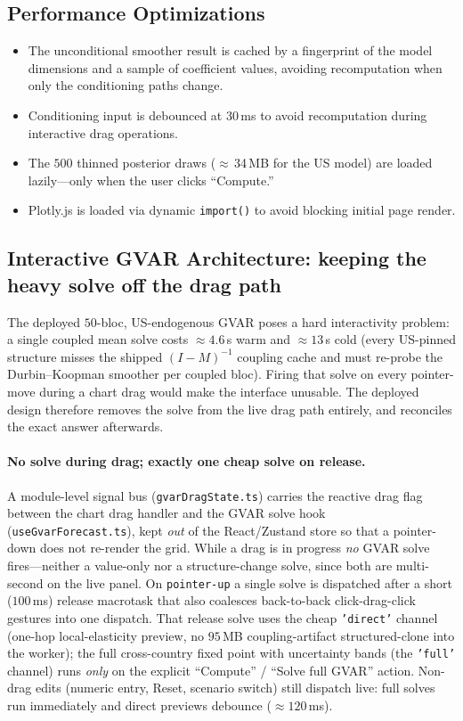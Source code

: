 \documentclass[11pt]{article}
\theoremstyle{definition}
\theoremstyle{remark}
\begin{document}
\subsection{Performance Optimizations}

\begin{itemize}
  \item The unconditional smoother result is cached by a fingerprint
    of the model dimensions and a sample of coefficient values,
    avoiding recomputation when only the conditioning paths change.
  \item Conditioning input is debounced at 30\,ms to avoid
    recomputation during interactive drag operations.
  \item The $500$ thinned posterior draws ($\approx$\,34\,MB for the US model)
    are loaded lazily---only when the user clicks ``Compute.''
  \item Plotly.js is loaded via dynamic \texttt{import()} to avoid
    blocking initial page render.
\end{itemize}

\subsection{Interactive GVAR Architecture: keeping the heavy solve off the drag path}\label{sec:perfux}

The deployed $50$-bloc, US-endogenous GVAR poses a hard
interactivity problem: a single coupled mean solve costs
$\approx 4.6$\,s warm and $\approx 13$\,s cold (every US-pinned structure
misses the shipped $(I-M)^{-1}$ coupling cache and must re-probe the
Durbin--Koopman smoother per coupled bloc). Firing that solve on every
pointer-move during a chart drag would make the interface unusable. The
deployed design therefore removes the solve from the live drag path
entirely, and reconciles the exact answer afterwards.

\paragraph{No solve during drag; exactly one cheap solve on release.}
A module-level signal bus (\texttt{gvarDragState.ts}) carries the reactive
drag flag between the chart drag handler and the GVAR solve hook
(\texttt{useGvarForecast.ts}), kept \emph{out} of the React/Zustand store
so that a pointer-down does not re-render the grid. While a drag is in
progress \emph{no} GVAR solve fires---neither a value-only nor a
structure-change solve, since both are multi-second on the live panel.
On \texttt{pointer-up} a single solve is dispatched after a short
($100$\,ms) release macrotask that also coalesces back-to-back
click-drag-click gestures into one dispatch. That release solve uses the
cheap \texttt{'direct'} channel (one-hop local-elasticity preview, no
$95$\,MB coupling-artifact structured-clone into the worker); the full
cross-country fixed point with uncertainty bands (the \texttt{'full'}
channel) runs \emph{only} on the explicit ``Compute'' / ``Solve full
GVAR'' action. Non-drag edits (numeric entry, Reset, scenario switch)
still dispatch live: full solves run immediately and direct previews
debounce ($\approx 120$\,ms).
\end{document}
